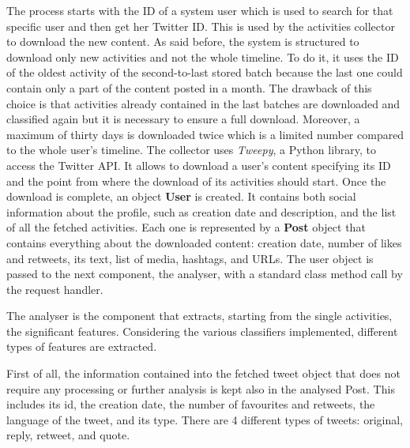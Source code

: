 The process starts with the ID of a system user which is used to search for that specific user and then get her Twitter ID. 
This is used by the activities collector to download the new content. As said before, the system is structured to download only new activities and not the whole timeline.
To do it, it uses the ID of the oldest activity of the second-to-last stored batch because the last one could contain only a part of the content posted in a month. 
The drawback of this choice is that activities already contained in the last batches are downloaded and classified again but it is necessary to ensure a full download. Moreover, a maximum of thirty days is downloaded twice which is a limited number compared to the whole user's timeline.
The collector uses \textit{Tweepy}, a Python library, to access the Twitter API. It allows to download a user's content specifying its ID and the point from where the download of its activities should start.
Once the download is complete, an object \textbf{User} is created. It contains both social information about the profile, such as creation date and description, and the list of all the fetched activities. Each one is represented by a \textbf{Post} object that contains everything about the downloaded content: creation date, number of likes and retweets, its text, list of media, hashtags, and URLs.
The user object is passed to the next component, the analyser, with a standard class method call by the request handler.

The analyser is the component that extracts, starting from the single activities, the significant features.
Considering the various classifiers implemented, different types of features are extracted.

First of all, the information contained into the fetched tweet object that does not require any processing or further analysis is kept also in the analysed Post. This includes its id, the creation date, the number of favourites and retweets, the language of the tweet, and its type.
There are 4 different types of tweets: original, reply, retweet, and quote.

